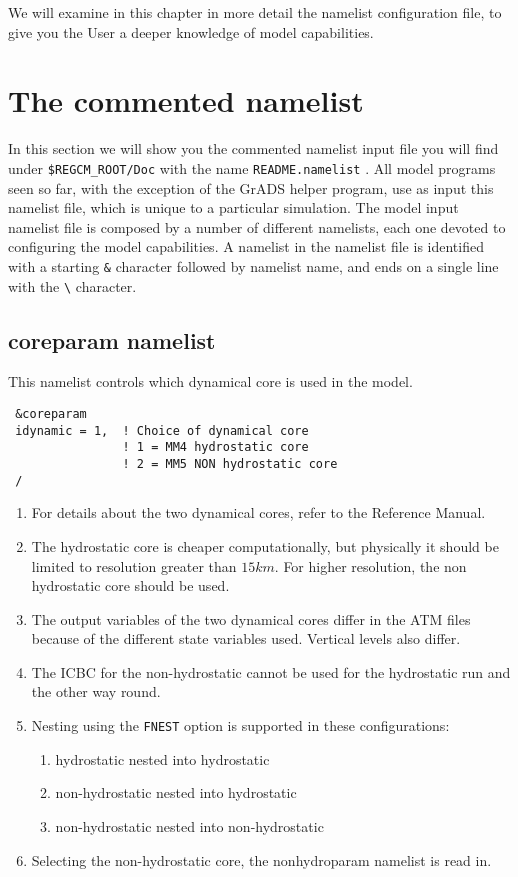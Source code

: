 %
%

We will examine in this chapter in more detail the namelist configuration file,
to give you the User a deeper knowledge of model capabilities.

\section{The commented namelist}

In this section we will show you the commented namelist input file you will
find under \verb=$REGCM_ROOT/Doc= with the name \verb=README.namelist= .
All model programs seen so far, with the exception of the GrADS helper program,
use as input this namelist file, which is unique to a particular simulation.
The model input namelist file is composed by a number of different namelists,
each one devoted to configuring the model capabilities.
A namelist in the namelist file is identified with a starting \verb=&= character
followed by namelist name, and ends on a single line with the \verb=\=
character.

\subsection{coreparam namelist}
\label{coreparam}

This namelist controls which dynamical core is used in the model.

{\footnotesize
\begin{Verbatim}
 &coreparam
 idynamic = 1,  ! Choice of dynamical core
                ! 1 = MM4 hydrostatic core
                ! 2 = MM5 NON hydrostatic core
 /
\end{Verbatim}
}

\begin{enumerate}
\item For details about the two dynamical cores, refer to the Reference Manual.
\item The hydrostatic core is cheaper computationally, but physically it should
be limited to resolution greater than $15 km$. For higher resolution, the non
hydrostatic core should be used.
\item The output variables of the two dynamical cores differ in the ATM files
because of the different state variables used. Vertical levels also differ.
\item The ICBC for the non-hydrostatic cannot be used for the hydrostatic run
and the other way round.
\item Nesting using the \verb=FNEST= option is supported in these
configurations:
\begin{enumerate}
\item hydrostatic nested into hydrostatic
\item non-hydrostatic nested into hydrostatic
\item non-hydrostatic nested into non-hydrostatic
\end{enumerate}
\item Selecting the non-hydrostatic core, the nonhydroparam namelist is read
in.
\end{enumerate}

